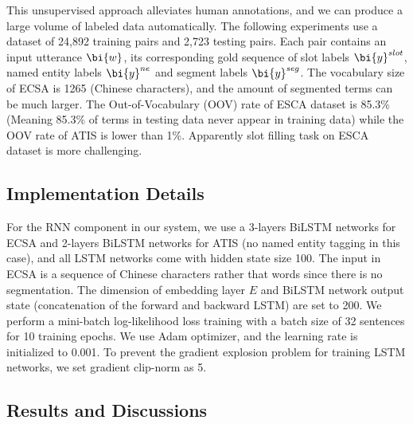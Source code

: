 This unsupervised approach 
alleviates human annotations, 
and we can produce a large volume of labeled data automatically. 
The following experiments use a dataset of 24,892 training pairs
and 2,723 testing pairs.
Each pair contains an input utterance $\bi{w}$, 
its corresponding gold sequence of slot labels $\bi{y}^{slot}$,
named entity labels $\bi{y}^{ne}$ and segment labels $\bi{y}^{seg}$.
The vocabulary size of ECSA is 1265 (Chinese characters), and the amount of segmented terms can be much larger.
The Out-of-Vocabulary (OOV) rate of ESCA dataset is 85.3\% (Meaning 85.3\% of terms in testing data never appear in training data) while the OOV rate of ATIS is lower than 1\%.
Apparently slot filling task on ESCA dataset is more challenging. 

\subsection{Implementation Details}
\label{sec:implementation}
For the RNN component in our system,
we use a 3-layers BiLSTM networks for ECSA and 2-layers BiLSTM networks for ATIS (no named entity tagging in this case),
and all LSTM networks come with hidden state size 100.
The input in ECSA is a sequence of Chinese characters rather that words 
since there is no segmentation.
The dimension of embedding layer $E$ 
and BiLSTM network output state (concatenation of the forward and backward LSTM) are set to 200.
We perform a mini-batch log-likelihood loss training with a batch size of 
32 sentences for 10 training epochs.
We use Adam optimizer, and the learning rate is initialized to 0.001.
To prevent the gradient explosion problem for training LSTM networks,
we set gradient clip-norm as 5.

\subsection{Results and Discussions}
\label{sec:eval}

